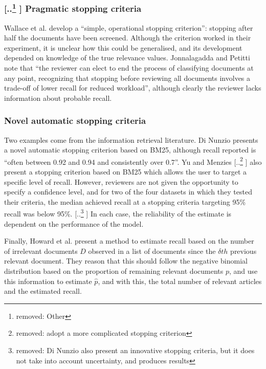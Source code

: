 \documentclass{bmcart}
\providecommand{\DIFadd}[1]{{\protect\color{blue} \sf #1}} %
\providecommand{\DIFdel}[1]{{\protect\color{red} [..\footnote{removed: #1} ]}} %
\providecommand{\DIFaddbegin}{} %
\providecommand{\DIFaddend}{} %
\providecommand{\DIFdelbegin}{} %
\providecommand{\DIFdelend}{} %
\newcommand{\DIFscaledelfig}{0.5}
\newlength{\DIFdelgraphicswidth} %
\newlength{\DIFdelgraphicsheight} %
\newcommand{\DIFaddincludegraphics}[2][]{{\color{blue}\fbox{\DIFOincludegraphics[#1]{#2}}}} %
\newcommand{\DIFdelincludegraphics}[2][]{%
\sbox{\DIFdelgraphicsbox}{\DIFOincludegraphics[#1]{#2}}%
\settoboxwidth{\DIFdelgraphicswidth}{\DIFdelgraphicsbox} %
\settoboxtotalheight{\DIFdelgraphicsheight}{\DIFdelgraphicsbox} %
\scalebox{\DIFscaledelfig}{%
\parbox[b]{\DIFdelgraphicswidth}{\usebox{\DIFdelgraphicsbox}\\[-\baselineskip] \rule{\DIFdelgraphicswidth}{0em}}\llap{\resizebox{\DIFdelgraphicswidth}{\DIFdelgraphicsheight}{%
\setlength{\unitlength}{\DIFdelgraphicswidth}%
\begin{picture}(1,1)%
\thicklines\linethickness{2pt} %
{\color[rgb]{1,0,0}\put(0,0){\framebox(1,1){}}}%
{\color[rgb]{1,0,0}\put(0,0){\line( 1,1){1}}}%
{\color[rgb]{1,0,0}\put(0,1){\line(1,-1){1}}}%
\end{picture}%
}\hspace*{3pt}}} %
} %
\DeclareRobustCommand{\DIFaddbegin}{\DIFOaddbegin \let\includegraphics\DIFaddincludegraphics} %
\DeclareRobustCommand{\DIFaddend}{\DIFOaddend \let\includegraphics\DIFOincludegraphics} %
\DeclareRobustCommand{\DIFdelbegin}{\DIFOdelbegin \let\includegraphics\DIFdelincludegraphics} %
\DeclareRobustCommand{\DIFdelend}{\DIFOaddend \let\includegraphics\DIFOincludegraphics} %
\begin{document}
	\subsubsection*{\DIFdelbegin \DIFdel{Other }\DIFdelend \DIFaddbegin \DIFadd{Pragmatic }\DIFaddend stopping criteria}

	Wallace et al. \cite{Wallace2010a} develop a ``simple, operational stopping criterion'': stopping after half the documents have been screened. Although the criterion worked in their experiment, it is unclear how this could be generalised, and its development depended on knowledge of the true relevance values. 
	Jonnalagadda and Petitti \cite{Jonnalagadda2013} note that ``the reviewer can elect to end the process of classifying documents at any point, recognizing that stopping before reviewing all documents involves a trade-off of lower recall for reduced workload'', although clearly the reviewer lacks information about probable recall.
	\DIFaddbegin 

	\subsubsection*{\DIFadd{Novel automatic stopping criteria}}
	\DIFadd{Two examples come from the information retrieval literature. Di Nunzio \cite{DiNunzio2018} presents a novel automatic stopping criterion based on BM25, although recall reported is ``often between 0.92 and 0.94 and consistently over 0.7''.
	}\DIFaddend Yu and Menzies \cite{Yu2019} \DIFdelbegin \DIFdel{adopt a more complicated stopping criterion }\DIFdelend \DIFaddbegin \DIFadd{also present a stopping criterion based on BM25 }\DIFaddend which allows the user to target a specific level of recall. 
	However, reviewers are not given the opportunity to specify a confidence level, and for two of the four datasets in which they tested their criteria, the median achieved recall at a stopping criteria targeting 95\% recall was below 95\%. \DIFdelbegin \DIFdel{Di Nunzio \cite{DiNunzio2018} also present an innovative stopping criteria, but it does not take into account uncertainty, and produces results }\DIFdelend \DIFaddbegin \DIFadd{In each case, the reliability of the estimate is dependent on the performance of the model.
	}

	\DIFadd{Finally, Howard et al. \cite{Howard2020} present a method to estimate recall based on the number of irrelevant documents $D$ observed in a list of documents since the $\delta th$ previous relevant document. 
	They reason that this should follow the negative binomial distribution based on the proportion of remaining relevant documents $p$, and use this information to estimate $\hat{p}$, and with this, the total number of relevant articles and the estimated recall.
	}
\end{document}
